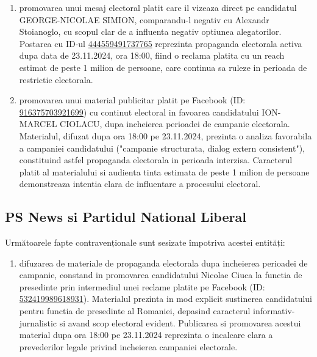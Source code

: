 \documentclass[a4paper,12pt]{article}
\begin{document}
\begin{enumerate}[leftmargin=*, label=\arabic*.)]
    \item promovarea unui mesaj electoral platit care il vizeaza direct pe candidatul GEORGE-NICOLAE SIMION, comparandu-l negativ cu Alexandr Stoianoglo, cu scopul clar de a influenta negativ optiunea alegatorilor. Postarea cu ID-ul \href{https://www.facebook.com/ads/library/?id=444559491737765}{444559491737765} reprezinta propaganda electorala activa dupa data de 23.11.2024, ora 18:00, fiind o reclama platita cu un reach estimat de peste 1 milion de persoane, care continua sa ruleze in perioada de restrictie electorala.
    \item promovarea unui material publicitar platit pe Facebook (ID: \href{https://www.facebook.com/ads/library/?id=916375703921699}{916375703921699}) cu continut electoral in favoarea candidatului ION-MARCEL CIOLACU, dupa incheierea perioadei de campanie electorala. Materialul, difuzat dupa ora 18:00 pe 23.11.2024, prezinta o analiza favorabila a campaniei candidatului ("campanie structurata, dialog extern consistent"), constituind astfel propaganda electorala in perioada interzisa. Caracterul platit al materialului si audienta tinta estimata de peste 1 milion de persoane demonstreaza intentia clara de influentare a procesului electoral.
\end{enumerate}

\vspace{0.5cm}

\subsection{PS News si Partidul National Liberal}
Următoarele fapte contravenționale sunt sesizate împotriva acestei entități:

\begin{enumerate}[leftmargin=*, label=\arabic*.)]
    \item difuzarea de materiale de propaganda electorala dupa incheierea perioadei de campanie, constand in promovarea candidatului Nicolae Ciuca la functia de presedinte prin intermediul unei reclame platite pe Facebook (ID: \href{https://www.facebook.com/ads/library/?id=532419989618931}{532419989618931}). Materialul prezinta in mod explicit sustinerea candidatului pentru functia de presedinte al Romaniei, depasind caracterul informativ-jurnalistic si avand scop electoral evident. Publicarea si promovarea acestui material dupa ora 18:00 pe 23.11.2024 reprezinta o incalcare clara a prevederilor legale privind incheierea campaniei electorale.
\end{enumerate}
\end{document}
